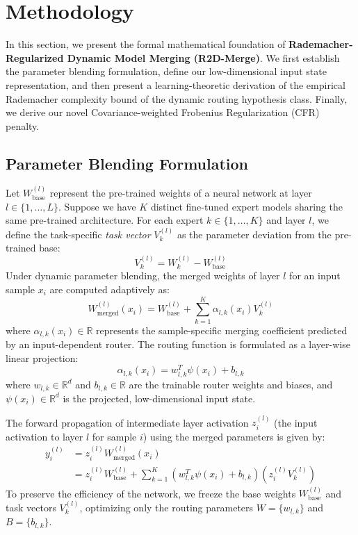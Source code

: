 \section{Methodology}
\label{submission:method}

In this section, we present the formal mathematical foundation of \textbf{Rademacher-Regularized Dynamic Model Merging (R2D-Merge)}. We first establish the parameter blending formulation, define our low-dimensional input state representation, and then present a learning-theoretic derivation of the empirical Rademacher complexity bound of the dynamic routing hypothesis class. Finally, we derive our novel Covariance-weighted Frobenius Regularization (CFR) penalty.

\subsection{Parameter Blending Formulation}
Let $W_{\text{base}}^{(l)}$ represent the pre-trained weights of a neural network at layer $l \in \{1, \dots, L\}$. Suppose we have $K$ distinct fine-tuned expert models sharing the same pre-trained architecture. For each expert $k \in \{1, \dots, K\}$ and layer $l$, we define the task-specific \emph{task vector} $V_k^{(l)}$ as the parameter deviation from the pre-trained base:
\begin{equation}
    V_k^{(l)} = W_k^{(l)} - W_{\text{base}}^{(l)}
\end{equation}
Under dynamic parameter blending, the merged weights of layer $l$ for an input sample $x_i$ are computed adaptively as:
\begin{equation}
    W_{\text{merged}}^{(l)}(x_i) = W_{\text{base}}^{(l)} + \sum_{k=1}^K \alpha_{l, k}(x_i) V_k^{(l)}
\end{equation}
where $\alpha_{l, k}(x_i) \in \mathbb{R}$ represents the sample-specific merging coefficient predicted by an input-dependent router. The routing function is formulated as a layer-wise linear projection:
\begin{equation}
    \alpha_{l, k}(x_i) = w_{l, k}^T \psi(x_i) + b_{l, k}
\end{equation}
where $w_{l, k} \in \mathbb{R}^d$ and $b_{l, k} \in \mathbb{R}$ are the trainable router weights and biases, and $\psi(x_i) \in \mathbb{R}^d$ is the projected, low-dimensional input state.

The forward propagation of intermediate layer activation $z_i^{(l)}$ (the input activation to layer $l$ for sample $i$) using the merged parameters is given by:
\begin{align}
    y_i^{(l)} &= z_i^{(l)} W_{\text{merged}}^{(l)}(x_i) \nonumber \\
    &= z_i^{(l)} W_{\text{base}}^{(l)} + \sum_{k=1}^K \left( w_{l, k}^T \psi(x_i) + b_{l, k} \right) \left( z_i^{(l)} V_k^{(l)} \right)
\end{align}
To preserve the efficiency of the network, we freeze the base weights $W_{\text{base}}^{(l)}$ and task vectors $V_k^{(l)}$, optimizing only the routing parameters $W = \{w_{l, k}\}$ and $B = \{b_{l, k}\}$.

